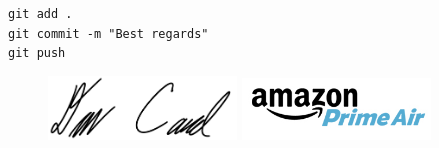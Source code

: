 \vspace{0.25in}
\texttt{git add .}\\
\texttt{git commit -m "Best regards"}\\
\texttt{git push}

\begin{figure}[h]
    \centering
    \begin{minipage}[h]{0.5\linewidth}
        \includegraphics[width=5cm, left]{photos/signature.png}
    \end{minipage}%
    \begin{minipage}[h]{0.5\linewidth}
        \includegraphics[width=5cm, right]{photos/<COMPANY-PHOTO>-logo.png}
    \end{minipage}
\end{figure}
